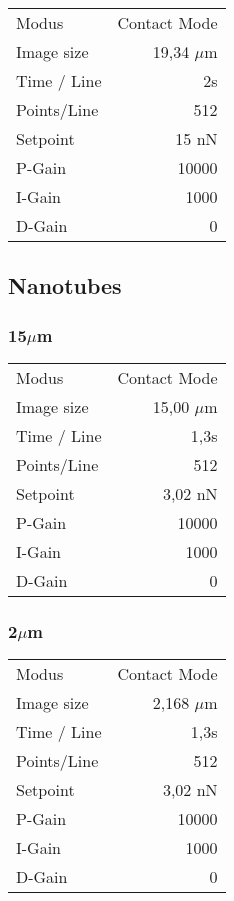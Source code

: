 \begin{center}
    \centering
    \begin{tabular}{l|r}
        Modus & Contact Mode\\
        Image size & 19,34 $\mu$m \\
        Time / Line & 2s \\
        Points/Line & 512\\
        Setpoint & 15 nN \\
        P-Gain & 10000 \\
        I-Gain & 1000 \\
        D-Gain & 0 \\
        
    \end{tabular}
\end{center}

\subsection*{Nanotubes}
\subsubsection*{15$\mu$m}

\begin{center}
    \centering
    \begin{tabular}{l|r}
        Modus & Contact Mode\\
        Image size & 15,00 $\mu$m \\
        Time / Line & 1,3s \\
        Points/Line & 512\\
        Setpoint & 3,02 nN \\
        P-Gain & 10000 \\
        I-Gain & 1000 \\
        D-Gain & 0 \\
        
    \end{tabular}
\end{center}

\subsubsection*{2$\mu$m}

\begin{center}
    \centering
    \begin{tabular}{l|r}
        Modus & Contact Mode\\
        Image size & 2,168 $\mu$m \\
        Time / Line & 1,3s \\
        Points/Line & 512\\
        Setpoint & 3,02 nN \\
        P-Gain & 10000 \\
        I-Gain & 1000 \\
        D-Gain & 0 \\
        
    \end{tabular}
\end{center}

